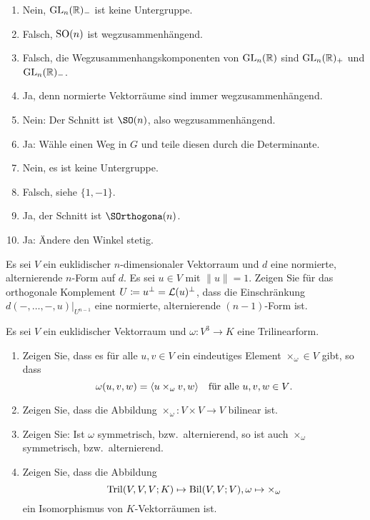 \documentclass[a4paper,10pt]{scrartcl}
\begin{document}
\begin{solution}
  \begin{enumerate}
    \item
      Nein, $\operatorname{GL}_n(\mathbb{R})_-$ ist keine Untergruppe.
    \item
      Falsch, $\operatorname{SO}(n)$ ist wegzusammenhängend.
    \item
      Falsch, die Wegzusammenhangskomponenten von $\operatorname{GL}_n(\mathbb{R})$ sind $\operatorname{GL}_n(\mathbb{R})_+$ und $\operatorname{GL}_n(\mathbb{R})_-$.
    \item
      Ja, denn normierte Vektorräume sind immer wegzusammenhängend.
    \item
      Nein: Der Schnitt ist $\SO(n)$, also wegzusammenhängend.
    \item
      Ja: Wähle einen Weg in $G$ und teile diesen durch die Determinante.
    \item
      Nein, es ist keine Untergruppe.
    \item
      Falsch, siehe $\{1,-1\}$.
    \item
      Ja, der Schnitt ist $\SOrthogona(n)$.
    \item
      Ja: Ändere den Winkel stetig.
  \end{enumerate}
\end{solution}


\begin{question}
  Es sei $V$ ein euklidischer $n$-dimensionaler Vektorraum und $d$ eine normierte, alternierende $n$-Form auf $d$.
  Es sei $u \in V$ mit $\|u\| = 1$.
  Zeigen Sie für das orthogonale Komplement $U \coloneqq u^\perp = \operatorname{\mathcal{L}}(u)^\perp$, dass die Einschränkung $d(-, \dotsc, -, u)|_{U^{n-1}}$ eine normierte, alternierende $(n-1)$-Form ist.
\end{question}


\begin{question}
  Es sei $V$ ein euklidischer Vektorraum und $\omega \colon V^3 \to K$ eine Trilinearform.
  \begin{enumerate}[leftmargin=*]
    \item
      Zeigen Sie, dass es für alle $u, v \in V$ ein eindeutiges Element $\times_\omega \in V$ gibt, so dass
      \[
          \omega(u, v, w)
        = \langle u \times_\omega v, w \rangle
        \quad
        \text{für alle $u, v, w \in V$}.
      \]
    \item
      Zeigen Sie, dass die Abbildung $\times_\omega \colon V \times V \to V$ bilinear ist.
    \item
      Zeigen Sie:
      Ist $\omega$ symmetrisch, bzw.\ alternierend, so ist auch $\times_\omega$ symmetrisch, bzw.\ alternierend.
    \item
      Zeigen Sie, dass die Abbildung
      \[
        \operatorname{Tril}(V, V, V; K) \mapsto \operatorname{Bil}(V, V; V),
        \omega
        \mapsto
        \times_\omega
      \]
      ein Isomorphismus von $K$-Vektorräumen ist.
  \end{enumerate} 
\end{question}
\end{document}
